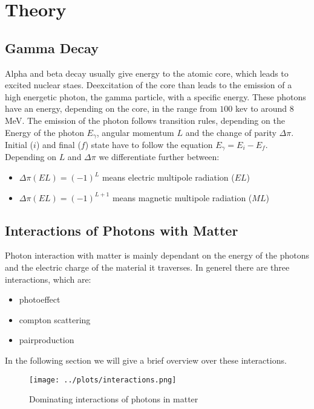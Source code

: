 \section{Theory}

\subsection{Gamma Decay}

Alpha and beta decay usually give energy to the atomic core, which leads to excited nuclear staes.
Deexcitation of the core than leads to the emission of a high energetic photon, the gamma particle, with a specific energy.
These photons have an energy, depending on the core, in the range from $100$ kev to around $8$MeV.
The emission of the photon follows transition rules, depending on the Energy of the photon $E_{\gamma}$, angular momentum $L$ and the change of parity $\Delta \pi$.
Initial ($i$) and final ($f$) state have to follow the equation $E_{\gamma} = E_i - E_f$.
Depending on $L$ and $\Delta \pi$ we differentiate further between:
\begin{itemize}
\item $\Delta \pi (EL) = (-1)^L $ means electric multipole radiation ($EL$)
\item $\Delta \pi (EL) = (-1)^{L+1} $ means magnetic multipole radiation ($ML$)
\end{itemize}

\subsection{Interactions of Photons with Matter}

Photon interaction with matter is mainly dependant on the energy of the photons and the electric charge of the material it traverses.
In generel there are three interactions, which are:
\begin{itemize}
\item photoeffect
\item compton scattering
\item pairproduction
\end{itemize}
In the following section we will give a brief overview over these interactions.

\begin{figure}[ht]
	\centering
    \texttt{[image: ../plots/interactions.png]}
	\caption{Dominating interactions of photons in matter}
	\label{interactions}
\end{figure}

